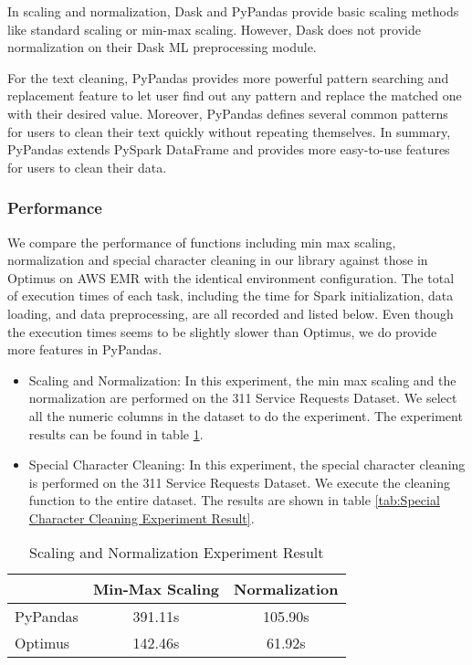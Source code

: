 \documentclass[sigconf]{acmart}
\begin{document}
In scaling and normalization, Dask and PyPandas provide basic scaling methods like standard scaling or min-max scaling. However, Dask does not provide normalization on their Dask ML preprocessing module.

For the text cleaning, PyPandas provides more powerful pattern searching and replacement feature to let user find out any pattern and replace the matched one with their desired value. Moreover, PyPandas defines several common patterns for users to clean their text quickly without repeating themselves. In summary, PyPandas extends PySpark DataFrame and provides more easy-to-use features for users to clean their data.

\subsubsection{Performance} We compare the performance of functions including min max scaling, normalization and special character cleaning in our library against those in Optimus on AWS EMR with the identical environment configuration. The total of execution times of each task, including the time for Spark initialization, data loading, and data preprocessing, are all recorded and listed below. Even though the execution times seems to be slightly slower than Optimus, we do provide more features in PyPandas.
\begin{itemize}
	\item{Scaling and Normalization}: In this experiment, the min max scaling and the normalization are performed on the 311 Service Requests Dataset. We select all the numeric columns in the dataset to do the experiment. The experiment results can be found in table \ref{tab:Scaling and Normalization Experiment Result}.
	\item{Special Character Cleaning}: In this experiment, the special character cleaning is performed on the 311 Service Requests Dataset. We execute the cleaning function to the entire dataset. The results are shown in table \ref{tab:Special Character Cleaning Experiment Result}.
\end{itemize}

\begin{table}
\caption{Scaling and Normalization Experiment Result}   
\label{tab:Scaling and Normalization Experiment Result}
\begin{tabular}{lcc}   
 	         &  Min-Max Scaling  &  Normalization \\
\hline
PyPandas   &  391.11s   & 105.90s  \\ 
Optimus     &  142.46s   & 61.92s   \\  
\end{tabular}   
\end{table}
\end{document}
